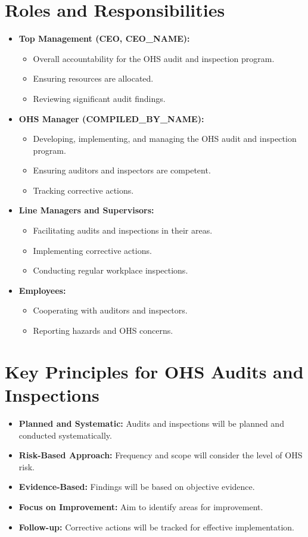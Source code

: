 \documentclass[12pt]{article}
\begin{document}
\section{Roles and Responsibilities}
\begin{itemize}
    \item \textbf{Top Management (CEO, {{CEO_NAME}}):}
    \begin{itemize}
        \item Overall accountability for the OHS audit and inspection program.
        \item Ensuring resources are allocated.
        \item Reviewing significant audit findings.
    \end{itemize}
    \item \textbf{OHS Manager ({{COMPILED_BY_NAME}}):}
    \begin{itemize}
        \item Developing, implementing, and managing the OHS audit and inspection program.
        \item Ensuring auditors and inspectors are competent.
        \item Tracking corrective actions.
    \end{itemize}
    \item \textbf{Line Managers and Supervisors:}
    \begin{itemize}
        \item Facilitating audits and inspections in their areas.
        \item Implementing corrective actions.
        \item Conducting regular workplace inspections.
    \end{itemize}
    \item \textbf{Employees:}
    \begin{itemize}
        \item Cooperating with auditors and inspectors.
        \item Reporting hazards and OHS concerns.
    \end{itemize}
\end{itemize}

\section{Key Principles for OHS Audits and Inspections}
\begin{itemize}
    \item \textbf{Planned and Systematic:} Audits and inspections will be planned and conducted systematically.
    \item \textbf{Risk-Based Approach:} Frequency and scope will consider the level of OHS risk.
    \item \textbf{Evidence-Based:} Findings will be based on objective evidence.
    \item \textbf{Focus on Improvement:} Aim to identify areas for improvement.
    \item \textbf{Follow-up:} Corrective actions will be tracked for effective implementation.
\end{itemize}
\end{document}
